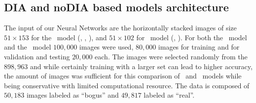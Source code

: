 \subsection{DIA and noDIA based models architecture}


The input of our Neural Networks are the horizontally stacked images of size $51 \times 153$ for the \diabased\ model (\diff, \search, \temp), and $51 \times 102$ for \nodia\ model (\search, \temp). For both the \diabased\ model and the \nodia\ model $100,000$ images were used, $80,000$ images for training  and for validation and testing $20,000$ each. The images were selected randomly from the $898,963$ and while certainly training with a larger set can lead to higher accuracy, the amount of images was sufficient for this comparison of \diabased\ and \nodia\ models while being conservative with limited computational resource. The data is composed of $50,183$ images labeled as ``bogus'' and $49,817$ labeled as ``real''. %

